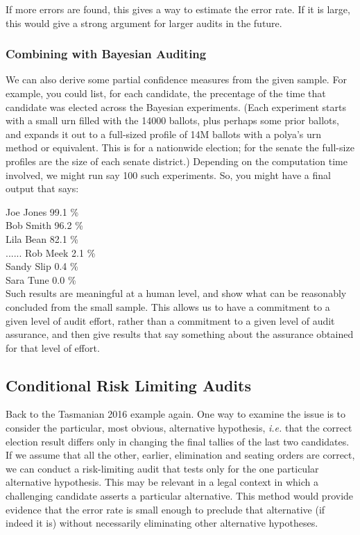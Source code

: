 \documentclass[10pt,a4paper]{article}
\begin{document}
If more errors are found, this gives a way to estimate the error rate.  If it is large, this would give a strong argument for larger audits in the future.

\subsubsection{Combining with Bayesian Auditing} 
We can also derive some partial confidence measures from the
given sample.  For example, you could list, for each candidate,
the precentage of the time that candidate was elected across the Bayesian
experiments.  (Each experiment starts with a small urn filled with
the 14000 ballots, plus perhaps some prior ballots, and expands
it out to a full-sized profile of 14M ballots with a polya's urn
method or equivalent.  This is for a nationwide election; for the
senate the full-size profiles are the size of each senate district.)
Depending on the computation time involved, we might run say
100 such experiments.  So, you might have a final output that says:

Joe Jones     99.1 \% \\
Bob Smith     96.2 \% \\
Lila Bean       82.1 \% \\
......
Rob Meek        2.1 \% \\ 
Sandy Slip       0.4 \%   \\
Sara Tune        0.0 \%   \\

Such results are meaningful at a human level, and show
what can be reasonably concluded from the small sample.
This allows us to have a commitment to a given
level of audit effort, rather than a commitment to a given level
of audit assurance, and then give results that say something about
the assurance obtained for that level of effort.


\subsection{Conditional Risk Limiting Audits}

Back to the Tasmanian 2016 example again. One way to examine the issue is to consider the particular, most obvious, alternative hypothesis, {\it i.e.} that the correct election result differs only in changing the final tallies of the last two candidates.  If we assume that all the other, earlier, elimination and seating orders are correct, we can conduct a risk-limiting audit that tests only for the one particular alternative hypothesis.  This may be relevant in a legal context in which a challenging candidate 
asserts a particular alternative. This method would provide evidence that the error rate is small enough to preclude that alternative (if indeed it is) without necessarily eliminating other alternative hypotheses.
\end{document}
